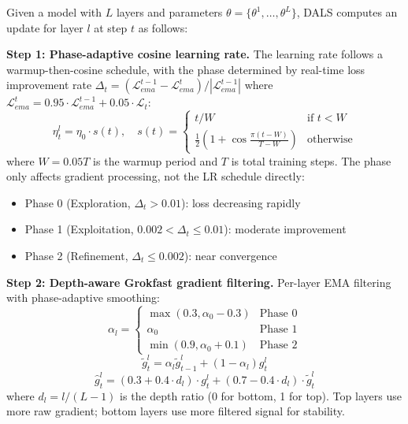 \documentclass[a4paper,fleqn]{cas-dc}
\begin{document}
Given a model with $L$ layers and parameters $\theta = \{\theta^1, \ldots, \theta^L\}$, DALS computes an update for layer $l$ at step $t$ as follows:

\textbf{Step 1: Phase-adaptive cosine learning rate.} The learning rate follows a warmup-then-cosine schedule, with the phase determined by real-time loss improvement rate $\Delta_t = (\mathcal{L}_{ema}^{t-1} - \mathcal{L}_{ema}^t) / |\mathcal{L}_{ema}^{t-1}|$ where $\mathcal{L}_{ema}^t = 0.95 \cdot \mathcal{L}_{ema}^{t-1} + 0.05 \cdot \mathcal{L}_t$:
\begin{equation}\label{eq:dals_lr}
\eta_t^l = \eta_0 \cdot s(t), \quad s(t) = \begin{cases} t / W & \text{if } t < W \\ \frac{1}{2}\left(1 + \cos\frac{\pi(t - W)}{T - W}\right) & \text{otherwise} \end{cases}
\end{equation}
where $W = 0.05T$ is the warmup period and $T$ is total training steps. The phase only affects gradient processing, not the LR schedule directly:
\begin{itemize}
\item Phase 0 (Exploration, $\Delta_t > 0.01$): loss decreasing rapidly
\item Phase 1 (Exploitation, $0.002 < \Delta_t \leq 0.01$): moderate improvement
\item Phase 2 (Refinement, $\Delta_t \leq 0.002$): near convergence
\end{itemize}

\textbf{Step 2: Depth-aware Grokfast gradient filtering.} Per-layer EMA filtering with phase-adaptive smoothing:
\begin{equation}\label{eq:dals_alpha}
\alpha_l = \begin{cases} \max(0.3, \alpha_0 - 0.3) & \text{Phase 0} \\ \alpha_0 & \text{Phase 1} \\ \min(0.9, \alpha_0 + 0.1) & \text{Phase 2} \end{cases}
\end{equation}
\begin{equation}\label{eq:dals_ema}
\tilde{g}_t^l = \alpha_l \tilde{g}_{t-1}^l + (1 - \alpha_l) g_t^l
\end{equation}
\begin{equation}\label{eq:dals_blend}
\hat{g}_t^l = (0.3 + 0.4 \cdot d_l) \cdot g_t^l + (0.7 - 0.4 \cdot d_l) \cdot \tilde{g}_t^l
\end{equation}
where $d_l = l / (L-1)$ is the depth ratio (0 for bottom, 1 for top). Top layers use more raw gradient; bottom layers use more filtered signal for stability.
\end{document}
